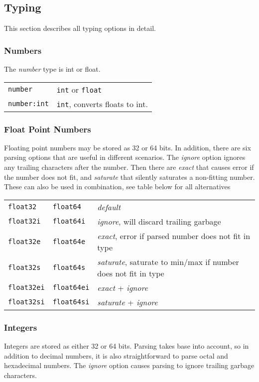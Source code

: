 \subsection{Typing}
This section describes all typing options in detail.

\subsubsection{Numbers}
The \emph{number} type is int or float.\\

\begin{tabular}{ll}
  \texttt{number}     & \texttt{int} or \texttt{float}\\
  \texttt{number:int} & \texttt{int}, converts floats to int.\\
\end{tabular}



\subsubsection{Float Point Numbers}
Floating point numbers may be stored as 32 or 64 bits.  In addition,
there are six parsing options that are useful in different scenarios.
The \emph{ignore} option ignores any trailing characters after the
number.  Then there are \emph{exact} that causes error if the number
does not fit, and \emph{saturate} that silently saturates a
non-fitting number.  These can also be used in combination, see table
below for all alternatives\\

\begin{tabular}{lll}
\texttt{float32} & \texttt{float64} & \emph{default}\\
\texttt{float32i} & \texttt{float64i} & \emph{ignore}, will discard trailing garbage\\
\texttt{float32e} & \texttt{float64e} & \emph{exact}, error if parsed number does not fit in type \\
\texttt{float32s} & \texttt{float64s} & \emph{saturate}, saturate to min/max if number does not fit in type \\
\texttt{float32ei} & \texttt{float64ei} & \emph{exact} + \emph{ignore} \\
\texttt{float32si} & \texttt{float64si} & \emph{saturate} + \emph{ignore} \\
\end{tabular}

\subsubsection{Integers}
Integers are stored as either 32 or 64 bits.  Parsing takes base into
account, so in addition to decimal numbers, it is also straightforward
to parse octal and hexadecimal numbers.  The \emph{ignore} option
causes parsing to ignore trailing garbage characters.\\

